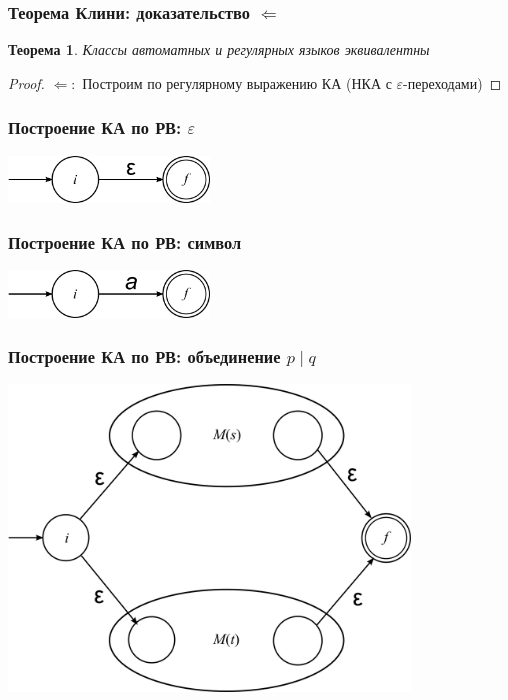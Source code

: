 \documentclass{beamer}
\newtheorem{rutheorem}{Теорема}
\begin{document}
\begin{frame}
  \transwipe[direction=90]
  \frametitle{Теорема Клини: доказательство $\Leftarrow$}

  \begin{rutheorem}
   Классы автоматных и регулярных языков \emph{эквивалентны}
  \end{rutheorem}

  \begin{proof}
    $\Leftarrow:$ Построим по регулярному выражению КА (НКА с $\varepsilon$-переходами)
  \end{proof}
\end{frame}

\begin{frame}
  \transwipe[direction=90]
  \frametitle{Построение КА по РВ: $\varepsilon$}
    \begin{center}
      \includegraphics[width=0.40\textwidth]{pics/epsilon.png}
    \end{center}
\end{frame}

\begin{frame}
  \transwipe[direction=90]
  \frametitle{Построение КА по РВ: символ}
    \begin{center}
      \includegraphics[width=0.40\textwidth]{pics/terminal.png}
    \end{center}
\end{frame}

\begin{frame}
  \transwipe[direction=90]
  \frametitle{Построение КА по РВ: объединение $p \mid q$}
    \begin{center}
      \includegraphics[width=0.80\textwidth]{pics/union.png}
    \end{center}
\end{frame}
\end{document}
